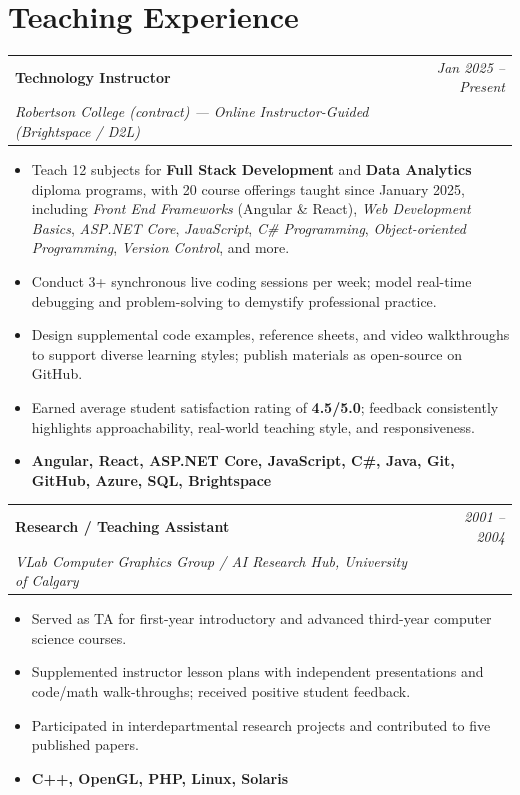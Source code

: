 \documentclass[11pt]{article}
\makeatletter
\newcommand{\tech}[1]{\textcolor{secondary}{\textbf{#1}}}
\newcommand{\experience}[4]{%
  \vspace{4pt}
  \begin{tabular*}{\textwidth}{@{}l@{\extracolsep{\fill}}r@{}}
    \textbf{#1} & \textit{#2} \\
    \textit{\small#3} & \textit{\small#4}
  \end{tabular*}
  \vspace{-4pt}
}
\makeatother
\begin{document}
\section*{Teaching Experience}

\experience{Technology Instructor}{Jan 2025 -- Present}{Robertson College (contract) \normalfont\small\textit{--- Online Instructor-Guided (Brightspace / D2L)}}{}
\begin{itemize}
    \item Teach 12 subjects for \tech{Full Stack Development} and \tech{Data Analytics} diploma programs, with 20 course offerings taught since January 2025, including \textit{Front End Frameworks} (Angular \& React), \textit{Web Development Basics}, \textit{ASP.NET Core}, \textit{JavaScript}, \textit{C\# Programming}, \textit{Object-oriented Programming}, \textit{Version Control}, and more.
    \item Conduct 3+ synchronous live coding sessions per week; model real-time debugging and problem-solving to demystify professional practice.
    \item Design supplemental code examples, reference sheets, and video walkthroughs to support diverse learning styles; publish materials as open-source on GitHub.
    \item Earned average student satisfaction rating of \textbf{4.5/5.0}; feedback consistently highlights approachability, real-world teaching style, and responsiveness.
    \item[] \tech{Angular, React, ASP.NET Core, JavaScript, C\#, Java, Git, GitHub, Azure, SQL, Brightspace}
\end{itemize}

\experience{Research / Teaching Assistant}{2001 -- 2004}{VLab Computer Graphics Group / AI Research Hub, University of Calgary}{}
\begin{itemize}
    \item Served as TA for first-year introductory and advanced third-year computer science courses.
    \item Supplemented instructor lesson plans with independent presentations and code/math walk-throughs; received positive student feedback.
    \item Participated in interdepartmental research projects and contributed to five published papers.
    \item[] \tech{C++, OpenGL, PHP, Linux, Solaris}
\end{itemize}
\end{document}
